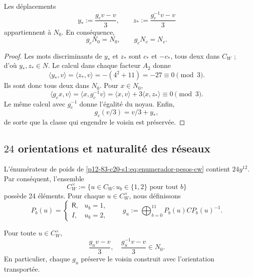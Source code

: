 \begin{theorem}
\label{p12-83-c20-s8:thm:preservacion-vecino-orden-tres-u031}
Les déplacements
\begin{equation}
 y_*:=\frac{g_cv-v}{3},
 \qquad
 z_*:=\frac{g_c^{-1}v-v}{3}
 \label{p12-83-c20-s8:eq:desplazamientos-vecino-u031}
\end{equation}
appartiennent à \(N_0\). En conséquence,
\[
 g_cN_0=N_0,
 \qquad
 g_cN_v=N_v.
\]
\end{theorem}

\begin{proof}
Les mots discriminants de \(y_*\) et \(z_*\) sont \(c_*\) et
\(-c_*\), tous deux dans \(C_W\) ; d'où \(y_*,z_*\in N\). Le calcul dans chaque
facteur \(A_2\) donne
\begin{equation}
 \langle y_*,v\rangle
 =\langle z_*,v\rangle
 =-(4^2+11)=-27\equiv0\pmod3.
 \label{p12-83-c20-s8:eq:emparejamientos-desplazamientos-u031}
\end{equation}
Ils sont donc tous deux dans \(N_0\). Pour \(x\in N_0\),
\[
 \langle g_cx,v\rangle
 =\langle x,g_c^{-1}v\rangle
 =\langle x,v\rangle+3\langle x,z_*\rangle
 \equiv0\pmod3.
\]
Le même calcul avec \(g_c^{-1}\) donne l'égalité du noyau. Enfin,
\[
 g_c(v/3)=v/3+y_*,
\]
de sorte que la classe qui engendre le voisin est préservée.
\end{proof}

\subsection{\(24\) orientations et naturalité des réseaux}

L’énumérateur de poids de \eqref{p12-83-c20-s1:eq:enumerador-pesos-cw} contient
\(24y^{12}\). Par conséquent, l’ensemble
\[
 C_W^\times:=
 \{u\in C_W:u_b\in\{1,2\}\text{ pour tout }b\}
\]
possède 24 éléments. Pour chaque \(u\in C_W^\times\), nous définissons
\[
 P_b(u)=
 \begin{cases}
  \mathsf R,&u_b=1,\\
  I,&u_b=2,
 \end{cases}
 \qquad
 g_u:=\bigoplus_{b=0}^{11}P_b(u)CP_b(u)^{-1}.
\]

\begin{proposition}
\label{p12-83-c20-s8:prop:robustez-orientaciones-u031}
Pour toute \(u\in C_W^\times\),
\[
 \frac{g_uv-v}{3},
 \quad
 \frac{g_u^{-1}v-v}{3}
 \in N_0.
\]
En particulier, chaque \(g_u\) préserve le voisin construit avec
l’orientation transportée.
\end{proposition}

